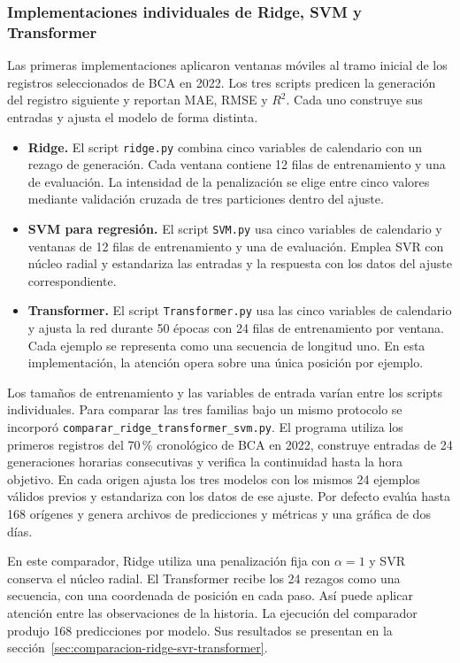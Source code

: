 \subsubsection{Implementaciones individuales de Ridge, SVM y Transformer}

Las primeras implementaciones aplicaron ventanas móviles al tramo inicial de los registros seleccionados de BCA en 2022. Los tres scripts predicen la generación del registro siguiente y reportan MAE, RMSE y \(R^2\). Cada uno construye sus entradas y ajusta el modelo de forma distinta.

\begin{itemize}
  \item \textbf{Ridge.} El script \texttt{ridge.py} combina cinco variables de calendario con un rezago de generación. Cada ventana contiene 12 filas de entrenamiento y una de evaluación. La intensidad de la penalización se elige entre cinco valores mediante validación cruzada de tres particiones dentro del ajuste.
  \item \textbf{SVM para regresión.} El script \texttt{SVM.py} usa cinco variables de calendario y ventanas de 12 filas de entrenamiento y una de evaluación. Emplea SVR con núcleo radial y estandariza las entradas y la respuesta con los datos del ajuste correspondiente.
  \item \textbf{Transformer.} El script \texttt{Transformer.py} usa las cinco variables de calendario y ajusta la red durante 50 épocas con 24 filas de entrenamiento por ventana. Cada ejemplo se representa como una secuencia de longitud uno. En esta implementación, la atención opera sobre una única posición por ejemplo.
\end{itemize}

Los tamaños de entrenamiento y las variables de entrada varían entre los scripts individuales. Para comparar las tres familias bajo un mismo protocolo se incorporó \texttt{comparar\_ridge\_transformer\_svm.py}. El programa utiliza los primeros registros del 70\,\% cronológico de BCA en 2022, construye entradas de 24 generaciones horarias consecutivas y verifica la continuidad hasta la hora objetivo. En cada origen ajusta los tres modelos con los mismos 24 ejemplos válidos previos y estandariza con los datos de ese ajuste. Por defecto evalúa hasta 168 orígenes y genera archivos de predicciones y métricas y una gráfica de dos días.

En este comparador, Ridge utiliza una penalización fija con \(\alpha=1\) y SVR conserva el núcleo radial. El Transformer recibe los 24 rezagos como una secuencia, con una coordenada de posición en cada paso. Así puede aplicar atención entre las observaciones de la historia. La ejecución del comparador produjo 168 predicciones por modelo. Sus resultados se presentan en la sección~\ref{sec:comparacion-ridge-svr-transformer}.

